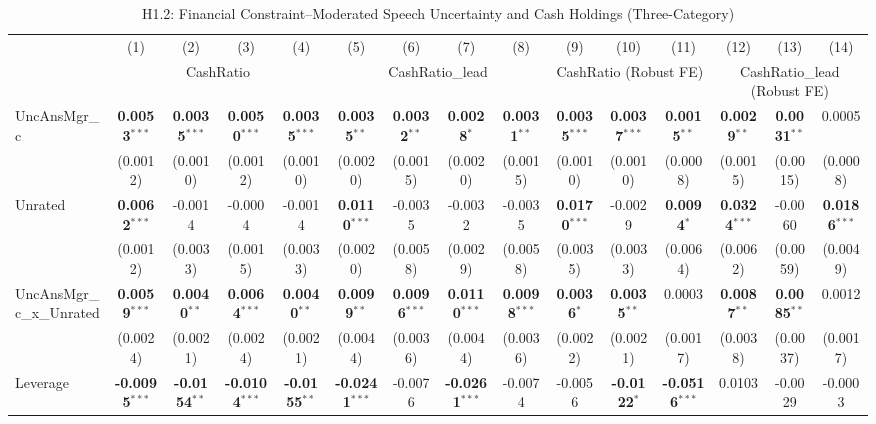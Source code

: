 \documentclass[11pt,a4paper]{article}
\begin{document}
\begin{table}[htbp]
\centering
\caption{H1.2: Financial Constraint--Moderated Speech Uncertainty and Cash Holdings (Three-Category)}
\label{tab:h1_2}
\scriptsize
\begin{tabular}{lcccccccccccccc}
\toprule
 & (1) & (2) & (3) & (4) & (5) & (6) & (7) & (8) & (9) & (10) & (11) & (12) & (13) & (14) \\
 & \multicolumn{4}{c}{CashRatio} & \multicolumn{4}{c}{CashRatio\_lead} & \multicolumn{3}{c}{CashRatio (Robust FE)} & \multicolumn{3}{c}{CashRatio\_lead (Robust FE)} \\
\cmidrule(lr){2-5} \cmidrule(lr){6-9} \cmidrule(lr){10-12} \cmidrule(lr){13-15}
\midrule
UncAnsMgr\_c & \textbf{0.0053}$^{***}$ & \textbf{0.0035}$^{***}$ & \textbf{0.0050}$^{***}$ & \textbf{0.0035}$^{***}$ & \textbf{0.0035}$^{**}$ & \textbf{0.0032}$^{**}$ & \textbf{0.0028}$^{*}$ & \textbf{0.0031}$^{**}$ & \textbf{0.0035}$^{***}$ & \textbf{0.0037}$^{***}$ & \textbf{0.0015}$^{**}$ & \textbf{0.0029}$^{**}$ & \textbf{0.0031}$^{**}$ & 0.0005 \\
 & (0.0012) & (0.0010) & (0.0012) & (0.0010) & (0.0020) & (0.0015) & (0.0020) & (0.0015) & (0.0010) & (0.0010) & (0.0008) & (0.0015) & (0.0015) & (0.0008) \\
Unrated & \textbf{0.0062}$^{***}$ & -0.0014 & -0.0004 & -0.0014 & \textbf{0.0110}$^{***}$ & -0.0035 & -0.0032 & -0.0035 & \textbf{0.0170}$^{***}$ & -0.0029 & \textbf{0.0094}$^{*}$ & \textbf{0.0324}$^{***}$ & -0.0060 & \textbf{0.0186}$^{***}$ \\
 & (0.0012) & (0.0033) & (0.0015) & (0.0033) & (0.0020) & (0.0058) & (0.0029) & (0.0058) & (0.0035) & (0.0033) & (0.0064) & (0.0062) & (0.0059) & (0.0049) \\
UncAnsMgr\_c\_x\_Unrated & \textbf{0.0059}$^{***}$ & \textbf{0.0040}$^{**}$ & \textbf{0.0064}$^{***}$ & \textbf{0.0040}$^{**}$ & \textbf{0.0099}$^{**}$ & \textbf{0.0096}$^{***}$ & \textbf{0.0110}$^{***}$ & \textbf{0.0098}$^{***}$ & \textbf{0.0036}$^{*}$ & \textbf{0.0035}$^{**}$ & 0.0003 & \textbf{0.0087}$^{**}$ & \textbf{0.0085}$^{**}$ & 0.0012 \\
 & (0.0024) & (0.0021) & (0.0024) & (0.0021) & (0.0044) & (0.0036) & (0.0044) & (0.0036) & (0.0022) & (0.0021) & (0.0017) & (0.0038) & (0.0037) & (0.0017) \\
\midrule
Leverage & \textbf{-0.0095}$^{***}$ & \textbf{-0.0154}$^{**}$ & \textbf{-0.0104}$^{***}$ & \textbf{-0.0155}$^{**}$ & \textbf{-0.0241}$^{***}$ & -0.0076 & \textbf{-0.0261}$^{***}$ & -0.0074 & -0.0056 & \textbf{-0.0122}$^{*}$ & \textbf{-0.0516}$^{***}$ & 0.0103 & -0.0029 & -0.0003 \\

\end{tabular}
\end{table}
\end{document}

